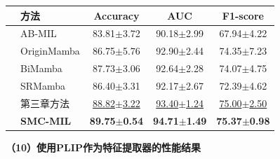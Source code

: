 \begin{table}[h!]
  \large    %
  \centering
  \begin{tabularx}{\textwidth}{clCCC}
    \toprule
    &方法  & Accuracy& AUC&F1-score\\ \midrule
    
    &AB-MIL  & 83.81$\pm$3.72 & 90.18$\pm$2.99 & 67.94$\pm$4.22\\
  &OriginMamba        & 86.75$\pm$5.76 & 92.90$\pm$2.44 & 74.35$\pm$7.23\\
  &BiMamba          & 87.73$\pm$3.06 & 92.64$\pm$2.28 & 74.07$\pm$4.75\\
  &SRMamba & 86.40$\pm$3.31 & 92.17$\pm$2.67 & 72.39$\pm$4.62\\
  &%
  第三章方法   & \underline{88.82$\pm$3.22} & \underline{93.40$\pm$1.24} & \underline{75.00$\pm$2.50}\\  
  &\textbf{SMC-MIL}        & \textbf{89.75$\pm$0.54} & \textbf{94.71$\pm$1.49} & \textbf{75.37$\pm$0.98}\\  

  \bottomrule
\end{tabularx}

  \label{table4: BRCA_PLIP}
\end{table}

\textbf{（10）使用PLIP作为特征提取器的性能结果}





